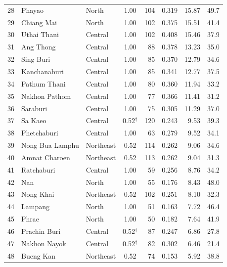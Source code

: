 \documentclass[fleqn,10pt]{olplainarticle}
\begin{document}
\begin{longtable}{@{}rllcrrrr@{}}
28 & Phayao             & North     & 1.00          & 104 & 0.319 & 15.87 & 49.7 \\
29 & Chiang Mai         & North     & 1.00          & 102 & 0.375 & 15.51 & 41.4 \\
30 & Uthai Thani        & Central   & 1.00          & 102 & 0.408 & 15.46 & 37.9 \\
31 & Ang Thong          & Central   & 1.00          &  88 & 0.378 & 13.23 & 35.0 \\
32 & Sing Buri          & Central   & 1.00          &  85 & 0.370 & 12.79 & 34.6 \\
33 & Kanchanaburi       & Central   & 1.00          &  85 & 0.341 & 12.77 & 37.5 \\
34 & Pathum Thani       & Central   & 1.00          &  80 & 0.360 & 11.94 & 33.2 \\
35 & Nakhon Pathom      & Central   & 1.00          &  77 & 0.366 & 11.41 & 31.2 \\
36 & Saraburi           & Central   & 1.00          &  75 & 0.305 & 11.29 & 37.0 \\
37 & Sa Kaeo            & Central   & 0.52$^\dagger$ & 120 & 0.243 &  9.53 & 39.3 \\
38 & Phetchaburi        & Central   & 1.00          &  63 & 0.279 &  9.52 & 34.1 \\
39 & Nong Bua Lamphu    & Northeast & 0.52          & 114 & 0.262 &  9.06 & 34.6 \\
40 & Amnat Charoen      & Northeast & 0.52          & 113 & 0.262 &  9.04 & 31.3 \\
41 & Ratchaburi         & Central   & 1.00          &  59 & 0.256 &  8.76 & 34.2 \\
42 & Nan                & North     & 1.00          &  55 & 0.176 &  8.43 & 48.0 \\
43 & Nong Khai          & Northeast & 0.52          & 102 & 0.251 &  8.10 & 32.3 \\
44 & Lampang            & North     & 1.00          &  51 & 0.163 &  7.72 & 46.4 \\
45 & Phrae              & North     & 1.00          &  50 & 0.182 &  7.64 & 41.9 \\
46 & Prachin Buri       & Central   & 0.52$^\dagger$ &  87 & 0.247 &  6.86 & 27.8 \\
47 & Nakhon Nayok       & Central   & 0.52$^\dagger$ &  82 & 0.302 &  6.46 & 21.4 \\
48 & Bueng Kan          & Northeast & 0.52          &  74 & 0.153 &  5.92 & 38.8 \\

\end{longtable}
\end{document}
